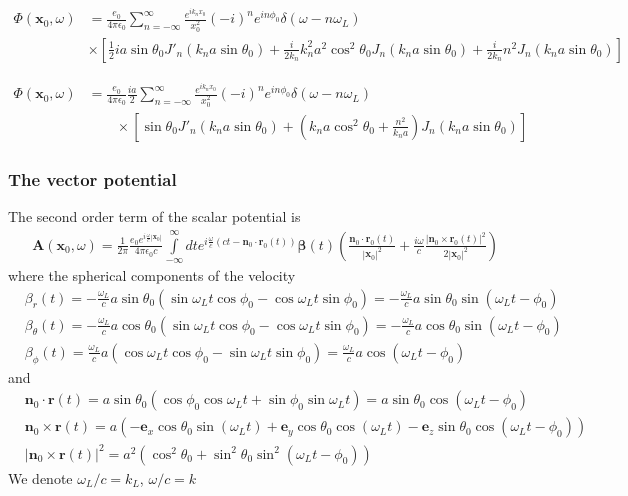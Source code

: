 \begin{align}
    \Phi({\bm x}_0,\omega) & =\frac{e_0}{4\pi\epsilon_0}\sum\limits_{n=-\infty}^{\infty}\frac{e^{ik_nx_0}}{x_0^2}(-i)^ne^{in\phi_0}\delta(\omega-n\omega_L)\nonumber                             \\
                           & \times\left[{\frac12ia\sin\theta_0}J'_{n}(k_na\sin\theta_0)+\frac{i}{2k_n}k_n^2a^2\cos^2\theta_0J_n(k_na\sin\theta_0)+\frac{i}{2k_n}n^2J_n(k_na\sin\theta_0)\right]
\end{align}

\begin{align}
    \Phi({\bm x}_0,\omega) & =\frac{e_0}{4\pi\epsilon_0}\frac{ia}2\sum\limits_{n=-\infty}^{\infty}\frac{e^{ik_nx_0}}{x_0^2}(-i)^ne^{in\phi_0}\delta(\omega-n\omega_L)\nonumber \\
                           & \qquad \times\left[{\sin\theta_0}J'_{n}(k_na\sin\theta_0)+\left(k_na\cos^2\theta_0+\frac{n^2}{k_na}\right)J_n(k_na\sin\theta_0)\right]
\end{align}

\subsubsection{The vector potential}

The second order term of the scalar potential is
\begin{align}
     & {\bm A}({\bm x}_0,\omega)=\frac1{2\pi}\frac{e_0 e^{i\frac{\omega}c|{\bm x}_0|}}{4\pi\epsilon_0 c}\int\limits_{-\infty}^{\infty}dte^{i\frac{\omega}c\left(ct-{\bm n}_0\cdot{\bm r}_0(t)\right)} {\boldsymbol{\beta}}(t)       \left(\frac{{\bm n}_0\cdot{\bm r}_0(t)}{|{\bm x}_0|^2}+\frac{i\omega}{c}\frac{|{\bm n}_0\times{\bm r}_0(t)|^2}{2|{\bm x}_0|^2}             \right)
\end{align}
where the spherical components of the velocity
\begin{align}
     & \beta_r(t)=-\frac{\omega_L}ca\sin\theta_0(\sin\omega_Lt\cos\phi_0-\cos\omega_Lt\sin\phi_0)=-\frac{\omega_L}{c}a\sin\theta_0\sin(\omega_Lt-\phi_0)      \\
     & \beta_\theta(t)=-\frac{\omega_L}ca\cos\theta_0(\sin\omega_Lt\cos\phi_0-\cos\omega_Lt\sin\phi_0)=-\frac{\omega_L}{c}a\cos\theta_0\sin(\omega_Lt-\phi_0) \\
     & \beta_\phi(t)=\frac{\omega_L}{c}a(\cos\omega_Lt\cos\phi_0-\sin\omega_Lt\sin\phi_0)=\frac{\omega_L}ca\cos(\omega_Lt-\phi_0)
\end{align}
and
\begin{align}
     & {\bm n}_0\cdot{\bm r}(t)=a\sin\theta_0(\cos\phi_0\cos\omega_Lt+\sin\phi_0\sin\omega_Lt)=a\sin\theta_0\cos(\omega_Lt-\phi_0)                            \\
     & {\bm n}_0\times{\bm r}(t)=a(-{\bm e}_x\cos\theta_0\sin(\omega_L t)+{\bm e}_y \cos\theta_0\cos(\omega_L t)-{\bm e}_z\sin\theta_0\cos(\omega_Lt-\phi_0)) \\
     & |{\bm n}_0\times{\bm r}(t)|^2=a^2\left(\cos^2\theta_0+\sin^2\theta_0\sin^2(\omega_Lt -\phi_0)\right)
\end{align}
We denote $\omega_L/c=k_L$, $\omega/c=k$

